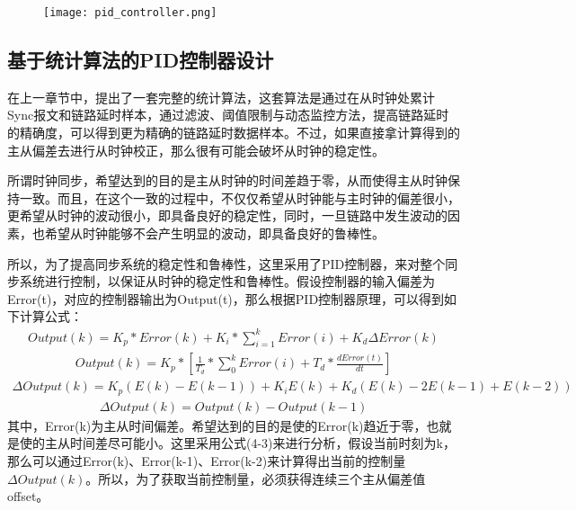 \begin{figure}[!hbp]
  \centering
  \begin{minipage}[b]{0.7\textwidth}
   \captionstyle{\centering}
   \centering
   \texttt{[image: pid\_controller.png]}
  \end{minipage}     
\end{figure}

\subsection{基于统计算法的PID控制器设计}
在上一章节中，提出了一套完整的统计算法，这套算法是通过在从时钟处累计Sync报文和链路延时样本，通过滤波、阈值限制与动态监控方法，提高链路延时的精确度，可以得到更为精确的链路延时数据样本。不过，如果直接拿计算得到的主从偏差去进行从时钟校正，那么很有可能会破坏从时钟的稳定性。

所谓时钟同步，希望达到的目的是主从时钟的时间差趋于零，从而使得主从时钟保持一致。而且，在这个一致的过程中，不仅仅希望从时钟能与主时钟的偏差很小，更希望从时钟的波动很小，即具备良好的稳定性，同时，一旦链路中发生波动的因素，也希望从时钟能够不会产生明显的波动，即具备良好的鲁棒性。

所以，为了提高同步系统的稳定性和鲁棒性，这里采用了PID控制器，来对整个同步系统进行控制，以保证从时钟的稳定性和鲁棒性。假设控制器的输入偏差为Error(t)，对应的控制器输出为Output(t)，那么根据PID控制器原理，可以得到如下计算公式：
\begin {align}
Output(k) = K_{p} * Error(k) + K_{i} * \sum_{i=1}^{k}Error(i) + K_{d}\Delta Error(k)
\end{align}
\begin {align}
Output(k) = K_{p} * [\frac{1}{T_{d}} * \sum_{0}^{k}Error(i) + T_{d} * \frac{dError(t)}{dt}]
\end{align}
\begin {align}
\Delta Output(k) = K_{p}(E(k) - E(k-1)) + K_{i}E(k) + K_{d}(E(k) - 2E(k-1) + E(k-2))
\end{align}
\begin {align}
\Delta Output(k) = Output(k) - Output(k-1)
\end{align}
其中，Error(k)为主从时间偏差。希望达到的目的是使的Error(k)趋近于零，也就是使的主从时间差尽可能小。这里采用公式(4-3)来进行分析，假设当前时刻为k，那么可以通过Error(k)、Error(k-1)、Error(k-2)来计算得出当前的控制量$\Delta Output(k)$。所以，为了获取当前控制量，必须获得连续三个主从偏差值offset。

